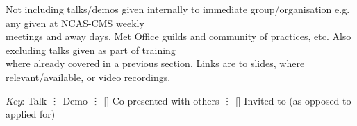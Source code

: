 
\hspace{2mm} Not including talks/demos given internally to immediate group/organisation e.g. any given at NCAS-CMS weekly\\\hspace*{3 mm}meetings and away days, Met Office guilds and community of practices, etc. Also excluding talks given as part of training\\\hspace*{3 mm}where already covered in a previous section. Links are to slides, where relevant/available, or video recordings.

\hspace{2mm} \textit{Key}: \hspace{2mm}
\faCommentingO \hspace{1mm} Talk \hspace{2mm} \vdots \hspace{2mm}
\faWrench \hspace{1mm} Demo \hspace{2mm} \vdots \hspace{2mm}
[\faUserPlus] \hspace{1mm} Co-presented with others \hspace{2mm} \vdots \hspace{2mm}
[\faEnvelopeO] \hspace{1mm} Invited to (as opposed to applied for)


